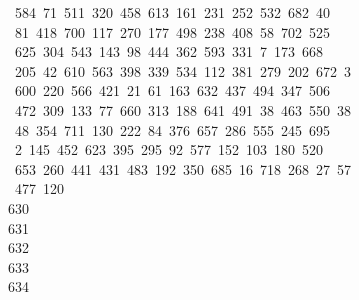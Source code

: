 \begin{tabbing}
\ 584\ 71\ 511\ 320\ 458\ 613\ 161\ 231\ 252\ 532\ 682\ 40\\[0pt]
\ 81\ 418\ 700\ 117\ 270\ 177\ 498\ 238\ 408\ 58\ 702\ 525\ \\[0pt]
\ 625\ 304\ 543\ 143\ 98\ 444\ 362\ 593\ 331\ 7\ 173\ 668\\[0pt]
\>\ 205\ 42\ 610\ 563\ 398\ 339\ 534\ 112\ 381\ 279\ 202\ 672\ 3\\[0pt]
\ 600\ 220\ 566\ 421\ 21\ 61\ 163\ 632\ 437\ 494\ 347\ 506\\[0pt]
\>\ 472\ 309\ 133\ 77\ 660\ 313\ 188\ 641\ 491\ 38\ 463\ 550\ 38\\[0pt]
\ 48\ 354\ 711\ 130\ 222\ 84\ 376\ 657\ 286\ 555\ 245\ 695\ \\[0pt]
\ 2\ 145\ 452\ 623\ 395\ 295\ 92\ 577\ 152\ 103\ 180\ 520\\[0pt]
\>\ 653\ 260\ 441\ 431\ 483\ 192\ 350\ 685\ 16\ 718\ 268\ 27\ 57\\[0pt]
\ 477\ 120\\[0pt]
630\>\\[0pt]
631\>\\[0pt]
632\>\\[0pt]
633\>\\[0pt]
634\>\\[0pt]

\end{tabbing}
